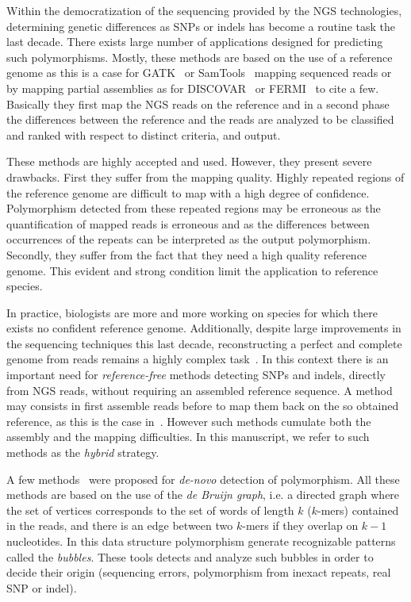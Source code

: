 \documentclass{bmcart}
\begin{document}
Within the democratization of the sequencing provided by the NGS technologies, determining genetic differences as SNPs or indels has become a routine task the last decade. There exists large number of applications designed for predicting such polymorphisms. Mostly, these methods are based on the use of a reference genome as this is a case for GATK~\cite{gatk} or SamTools~\cite{Li2009} mapping sequenced reads or by mapping partial assemblies as for DISCOVAR~\cite{Weisenfeld2014} or FERMI~\cite{Li2012} to cite a few. Basically they first map the NGS reads on the reference and in a second phase the differences between the reference and the reads are analyzed to be classified and ranked with respect to distinct criteria, and output. 

These methods are highly accepted and used. However, they present severe drawbacks. First they suffer from the mapping quality. Highly repeated regions of the reference genome are difficult to map with a high degree of confidence.  Polymorphism detected from these repeated regions may be erroneous as the quantification of mapped reads is erroneous and as the differences between occurrences of the repeats can be interpreted as the output polymorphism. Secondly, they suffer from the fact that they need a high quality reference genome. This evident and strong condition limit the application to reference species. 

In practice, biologists are more and more working on species for which there exists no confident reference genome. Additionally, despite large improvements in the sequencing techniques this last decade, reconstructing a perfect and complete genome from reads remains a highly complex task~\cite{assemblathon2}. In this context there is an important need for \emph{reference-free} methods detecting SNPs and indels, directly from NGS reads, without requiring an assembled reference sequence. A method may consists in first assemble reads before to map them back on the so obtained reference, as this is the case in~\cite{Willing2011}. However such methods cumulate both the assembly and the mapping difficulties. In this manuscript, we refer to such methods as the \emph{hybrid} strategy. 

A few methods~\cite{Peterlongo2010,iqbal2012novo,Leggett2013,Nordstrom2013,Kissplice} were proposed for \emph{de-novo} detection of polymorphism.  All these methods are based on the use of the \emph{de Bruijn graph}, i.e. a directed graph where the set of vertices corresponds to the set of words of length $k$ ($k$-mers) contained in the reads, and there is an edge between two $k$-mers if they overlap on $k-1$ nucleotides. In this data structure polymorphism generate recognizable patterns called the \emph{bubbles}. These tools detects and analyze such bubbles in order to decide their origin (sequencing errors, polymorphism from inexact repeats, real SNP or indel). 
\end{document}
